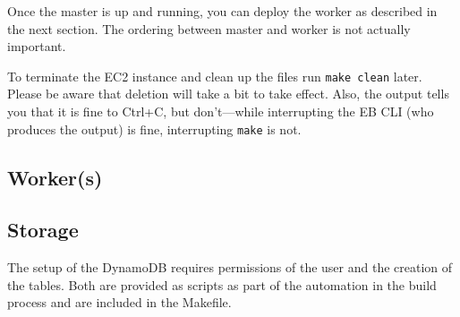\documentclass[english]{scrartcl}
\begin{document}
Once the master is up and running, you can deploy the worker as described in
the next section. The ordering between master and worker is not actually
important.

To terminate the EC2 instance and clean up the files run \texttt{make clean}
later. Please be aware that deletion will take a bit to take effect. Also, the
output tells you that it is fine to Ctrl+C, but don't---while interrupting the
EB CLI (who produces the output) is fine, interrupting \texttt{make} is not.

\subsection{Worker(s)}

\subsection{Storage}
The setup of the DynamoDB requires permissions of the user and the creation of the tables.
Both are provided as scripts as part of the automation in the build process and are included in the Makefile.
\end{document}
